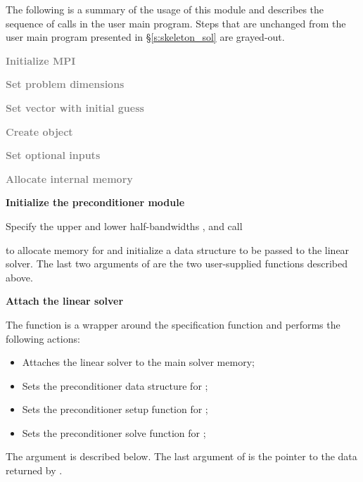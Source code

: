 The following is a summary of the usage of this module and describes the sequence
of calls in the user main program. Steps that are unchanged from the user main
program presented in \S\ref{s:skeleton_sol} are grayed-out.
\begin{Steps}
\item 
  \textcolor{gray}{\bf Initialize MPI}

\item
  \textcolor{gray}{\bf Set problem dimensions}

\item
  \textcolor{gray}{\bf Set vector with initial guess}
 
\item
  \textcolor{gray}{\bf Create {\kinsol} object}

\item
  \textcolor{gray}{\bf Set optional inputs}

\item
  \textcolor{gray}{\bf Allocate internal memory}

\item \label{i:bbdpre_init}
  {\bf Initialize the {\kinbbdpre} preconditioner module}

  Specify the upper and lower half-bandwidths ,  and call


  to allocate memory for and initialize a data structure  to be 
  passed to the {\kinspgmr} linear solver. The last two arguments of
   are the two user-supplied functions described above.

\item \label{i:bbdpre_attach}
  {\bf Attach the {\kinspgmr} linear solver}


  The function  is a wrapper around the {\kinspgmr} specification
  function  and performs the following actions:
  \begin{itemize}
    \item Attaches the {\kinspgmr} linear solver to the main {\cvode} solver memory;
    \item Sets the preconditioner data structure for {\kinbbdpre};
    \item Sets the preconditioner setup function for {\kinbbdpre};
    \item Sets the preconditioner solve function for {\kinbbdpre};
  \end{itemize}
  The argument  is described below.
  The last argument of  is the pointer to the {\kinbbdpre} data
  returned by .


\end{Steps}
